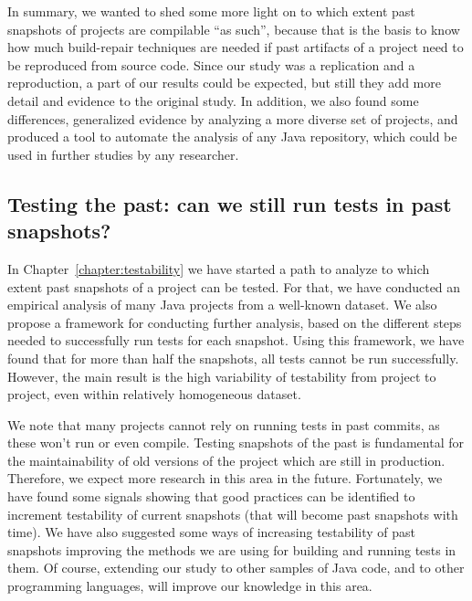 In summary, we wanted to shed some more light on to which extent past snapshots of projects are compilable ``as such'', because that is the basis to know how much build-repair techniques are needed if past artifacts of a project need to be reproduced from source code.
Since our study was a replication and a reproduction, a part of our results could be expected, but still they add more detail and evidence to the original study. In addition, we also found some differences, generalized evidence by analyzing a more diverse set of projects, and produced a tool to automate the analysis of any Java repository, which could be used in further studies by any researcher.

\subsection{Testing the past: can we still run tests in past snapshots?}

In Chapter~\ref{chapter:testability} we have started a path to analyze to which extent past snapshots of a project can be tested. 
For that, we have conducted an empirical analysis of many Java projects from a well-known dataset. 
We also propose a framework for conducting further analysis, based on the different steps needed to successfully run tests for each snapshot. 
Using this framework, we have found that for more than half the snapshots, all tests cannot be run successfully.
However, the main result is the high variability of testability from project to project, even within relatively homogeneous dataset. 


We note that many projects cannot rely on running tests in past commits, as these won’t run or even compile.
Testing snapshots of the past is fundamental for the maintainability of old versions of the project which are still in production. 
Therefore, we expect more research in this area in the future. 
Fortunately, we have found some signals showing that good practices can be identified to increment testability of current snapshots (that will become past snapshots with time). 
We have also suggested some ways of increasing testability of past snapshots improving the methods we are using for building and running tests in them. 
Of course, extending our study to other samples of Java code, and to other programming languages, will improve our knowledge in this area.

